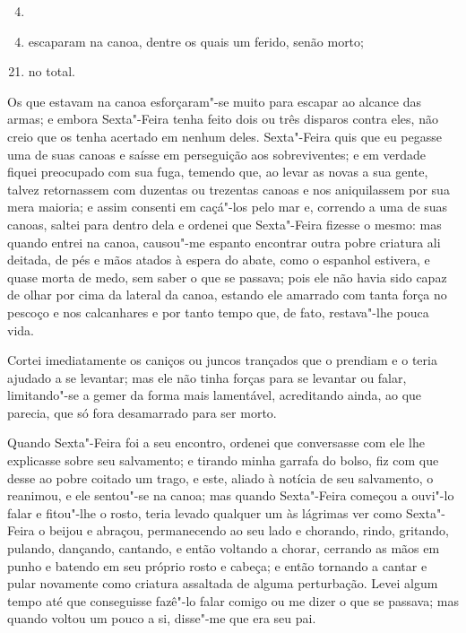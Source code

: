 \begin{enumerate}[label=\arabic*]
\setcounter{enumi}{3}
\item {}
\end{enumerate}

\begin{enumerate}[label=\arabic*]
\setcounter{enumi}{3}
\item escaparam na canoa, dentre os quais um ferido, senão morto;
\end{enumerate}

\begin{enumerate}[label=\arabic*]
\setcounter{enumi}{20}
\item no total.
\end{enumerate}

Os que estavam na canoa esforçaram"-se muito para escapar ao alcance das
armas; e embora Sexta"-Feira tenha feito dois ou três disparos contra
eles, não creio que os tenha acertado em nenhum deles. Sexta"-Feira quis
que eu pegasse uma de suas canoas e saísse em perseguição aos
sobreviventes; e em verdade fiquei preocupado com sua fuga, temendo que,
ao levar as novas a sua gente, talvez retornassem com duzentas ou
trezentas canoas e nos aniquilassem por sua mera maioria; e assim
consenti em caçá"-los pelo mar e, correndo a uma de suas canoas, saltei
para dentro dela e ordenei que Sexta"-Feira fizesse o mesmo: mas quando
entrei na canoa, causou"-me espanto encontrar outra pobre criatura ali
deitada, de pés e mãos atados à espera do abate, como o espanhol
estivera, e quase morta de medo, sem saber o que se passava; pois ele
não havia sido capaz de olhar por cima da lateral da canoa, estando ele
amarrado com tanta força no pescoço e nos calcanhares e por tanto tempo
que, de fato, restava"-lhe pouca vida.

Cortei imediatamente os caniços ou juncos trançados que o prendiam e o
teria ajudado a se levantar; mas ele não tinha forças para se levantar
ou falar, limitando"-se a gemer da forma mais lamentável, acreditando
ainda, ao que parecia, que só fora desamarrado para ser morto.

Quando Sexta"-Feira foi a seu encontro, ordenei que conversasse com ele
lhe explicasse sobre seu salvamento; e tirando minha garrafa do bolso,
fiz com que desse ao pobre coitado um trago, e este, aliado à notícia de
seu salvamento, o reanimou, e ele sentou"-se na canoa; mas quando
Sexta"-Feira começou a ouvi"-lo falar e fitou"-lhe o rosto, teria levado
qualquer um às lágrimas ver como Sexta"-Feira o beijou e abraçou,
permanecendo ao seu lado e
chorando, rindo, gritando,
pulando, dançando, cantando, e então voltando a chorar, cerrando as mãos
em punho e batendo em seu próprio rosto e cabeça; e então tornando a
cantar e pular novamente como criatura assaltada de alguma perturbação.
Levei algum tempo até que conseguisse fazê"-lo falar comigo ou me dizer o
que se passava; mas quando voltou um pouco a si, disse"-me que era seu
pai.

